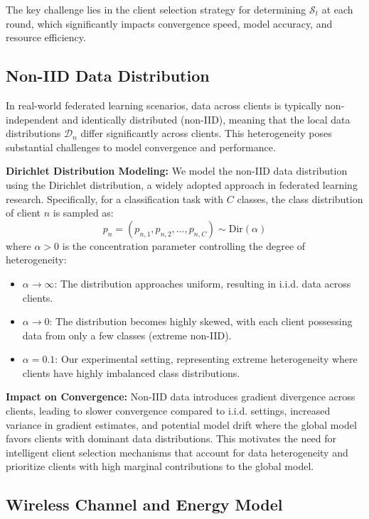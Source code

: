 The key challenge lies in the client selection strategy for determining $\mathcal{S}_t$ at each round, which significantly impacts convergence speed, model accuracy, and resource efficiency.

\subsection{Non-IID Data Distribution}

In real-world federated learning scenarios, data across clients is typically non-independent and identically distributed (non-IID), meaning that the local data distributions $\mathcal{D}_n$ differ significantly across clients. This heterogeneity poses substantial challenges to model convergence and performance.

\textbf{Dirichlet Distribution Modeling:} We model the non-IID data distribution using the Dirichlet distribution, a widely adopted approach in federated learning research. Specifically, for a classification task with $C$ classes, the class distribution of client $n$ is sampled as:
\begin{equation}
p_n = (p_{n,1}, p_{n,2}, \ldots, p_{n,C}) \sim \text{Dir}(\alpha)
\end{equation}
where $\alpha > 0$ is the concentration parameter controlling the degree of heterogeneity:
\begin{itemize}
\item $\alpha \to \infty$: The distribution approaches uniform, resulting in i.i.d. data across clients.
\item $\alpha \to 0$: The distribution becomes highly skewed, with each client possessing data from only a few classes (extreme non-IID).
\item $\alpha = 0.1$: Our experimental setting, representing extreme heterogeneity where clients have highly imbalanced class distributions.
\end{itemize}

\textbf{Impact on Convergence:} Non-IID data introduces gradient divergence across clients, leading to slower convergence compared to i.i.d. settings, increased variance in gradient estimates, and potential model drift where the global model favors clients with dominant data distributions. This motivates the need for intelligent client selection mechanisms that account for data heterogeneity and prioritize clients with high marginal contributions to the global model.

\subsection{Wireless Channel and Energy Model}

